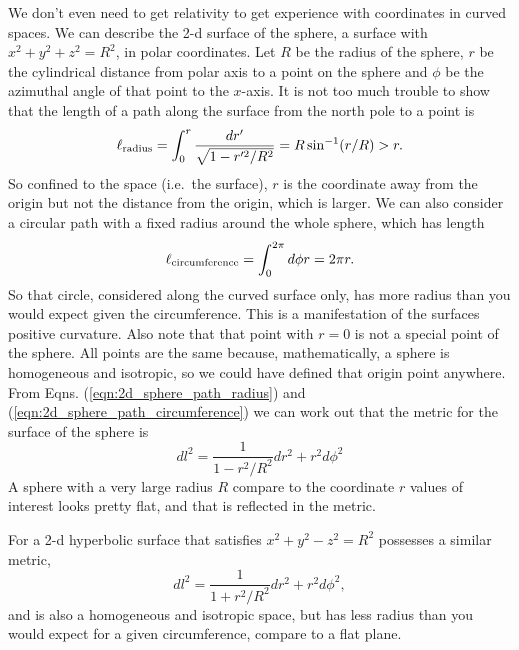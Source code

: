 We don't even need to get relativity to get experience with coordinates in curved spaces.  We can describe the 2-d surface of the sphere, a surface with $x^2 + y^2 + z^2 = R^2$, in polar coordinates.  Let $R$ be the radius of the sphere, $r$ be the cylindrical distance from polar axis to a point on the sphere and $\phi$ be the azimuthal angle of that point to the $x$-axis.  It is not too much trouble to show that the length of a path along the surface from the north pole to a point is 
\begin{equation}
  \ell_{\rm radius} = \int_0^r \frac{dr'}{\sqrt{1-r'^2/R^2}} = R \sin^{-1}(r/R) > r. \label{eqn:2d_sphere_path_radius}
\end{equation}
So confined to the space (i.e.\ the surface), $r$ is the coordinate away from the origin but not the distance from the origin, which is larger.
We can also consider a circular path with a fixed radius around the whole sphere, which has length
\begin{equation}
  \ell_{\rm circumference} = \int_0^{2\pi} d\phi r = 2\pi r.  \label{eqn:2d_sphere_path_circumference}
\end{equation}
So that circle, considered along the curved surface only, has more radius than you would expect given the circumference.  This is a manifestation of the surfaces positive curvature.  Also note that that point with $r=0$ is not a special point of the sphere.  All points are the same because, mathematically, a sphere is homogeneous and isotropic, so we could have defined that origin point anywhere. From Eqns. (\ref{eqn:2d_sphere_path_radius}) and (\ref{eqn:2d_sphere_path_circumference}) we can work out that the metric for the surface of the sphere is
\begin{equation}
  dl^2 = \frac{1}{1-r^2/R^2} dr^2 + r^2 d\phi^2
\end{equation}
A sphere with a very large radius $R$ compare to the coordinate $r$ values of interest looks pretty flat, and that is reflected in the metric.

For a 2-d hyperbolic surface that satisfies $x^2 + y^2 - z^2 = R^2$ possesses a similar metric,
\begin{equation}
    dl^2 = \frac{1}{1+r^2/R^2} dr^2 + r^2 d\phi^2,
\end{equation}
and is also a homogeneous and isotropic space, but has less radius than you would expect for a given circumference, compare to a flat plane.

